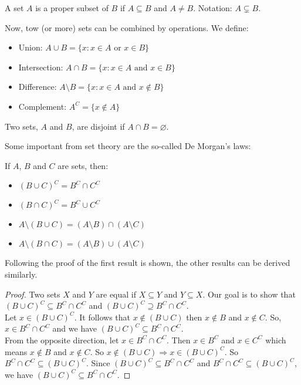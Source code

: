 \begin{definition}
    A set $A$ is a proper subset of $B$ if $A \subseteq B$ and $A \neq B$. Notation: $A \subsetneq B$.
\end{definition}

Now, tow (or more) sets can be combined by operations. We define:

\begin{itemize}
    \item Union: $A \cup B = \{ x: x \in A \text{ or } x \in B\}$
    \item Intersection: $A \cap B = \{ x: x \in A \text{ and } x \in B\}$
    \item Difference: $A \setminus B = \{ x : x \in A \text { and } x \notin B\}$
    \item Complement: $A^C = \{ x \notin A \}$
\end{itemize}

\begin{definition}
    Two sets, $A$ and $B$, are disjoint if $A \cap B = \varnothing$.
\end{definition}

Some important from set theory are the so-called De Morgan's laws:

\begin{theorem}
    If $A$, $B$ and $C$ are sets, then:
    \begin{itemize}
        \item $(B \cup C)^C = B^C \cap C^C$
        \item $(B \cap C)^C = B^C \cup C^C$
        \item $A \setminus (B \cup C) = (A \setminus B) \cap (A \setminus C)$
        \item $A \setminus (B \cap C) = (A \setminus B) \cup (A \setminus C)$
    \end{itemize}
\end{theorem}

Following the proof of the first result is shown, the other results can be derived similarly.

\begin{proof}
    Two sets $X$ and $Y$ are equal if $X \subseteq Y$ and $Y \subseteq X$. Our goal is to show that $(B \cup C)^C \subseteq B^C \cap C^C$ and $(B \cup C)^C \supseteq B^C \cap C^C$. \\
    Let $x \in (B \cup C)^C$. It follows that $x \notin (B \cup C)$ then $x \notin B$ and $x \notin C$. So, $x \in B^C \cap C^C$ and we have $(B \cup C)^C \subseteq B^C \cap C^C$. \\
    From the opposite direction, let  $x \in B^C \cap C^C$. Then $x \in B^C$ and $x \in C^C$ which means $x \notin B$ and $x \notin C$. So $x \notin (B \cup C) \Rightarrow x \in (B \cup C)^C$. So $B^C \cap C^C \subseteq (B \cup C)^C$.
    Since $(B \cup C)^C \subseteq B^C \cap C^C$ and $B^C \cap C^C \subseteq (B \cup C)^C$, we have $(B \cup C)^C \subseteq B^C \cap C^C$.
\end{proof}

